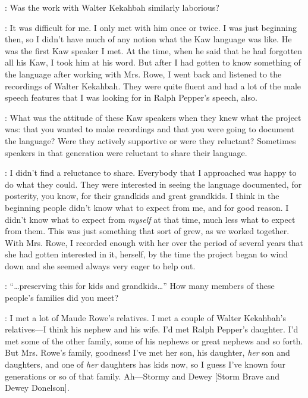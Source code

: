 \documentclass[output=paper]{LSP/langsci}
\begin{document}
: Was the work with Walter Kekahbah similarly laborious?

: It was difficult for me. I only met with him once or twice. I was just beginning then, so I didn't have much of any notion what the Kaw language was like. He was the first Kaw speaker I met. At the time, when he said that he had forgotten all his Kaw, I took him at his word. But after I had gotten to know something of the language after working with Mrs. Rowe, I went back and listened to the recordings of Walter Kekahbah. They were quite fluent and had a lot of the male speech features that I was looking for in Ralph Pepper's speech, also.

: What was the attitude of these Kaw speakers when they knew what the project was: that you wanted to make recordings and that you were going to document the language? Were they actively supportive or were they reluctant? Sometimes speakers in that generation were reluctant to share their language.

: I didn't find a reluctance to share. Everybody that I approached was happy to do what they could. They were interested in seeing the language documented, for posterity, you know, for their grandkids and great grandkids. I think in the beginning people didn't know what to expect from me, and for good reason. I didn't know what to expect from \textit{myself} at that time, much less what to expect from them. This was just something that sort of grew, as we worked together. With Mrs. Rowe, I recorded enough with her over the period of several years that she had gotten interested in it, herself, by the time the project began to wind down and she seemed always very eager to help out.

: ``\ldots preserving this for kids and grandkids\ldots'' How many members of these people's families did you meet?

:  I met a lot of Maude Rowe's relatives. I met a couple of Walter Kekahbah's relatives---I think his nephew and his wife. I'd met Ralph Pepper's daughter. I'd met some of the other family, some of his nephews or great nephews and so forth. But Mrs. Rowe's family, goodness! I've met her son, his daughter, \textit{her} son and daughters, and one of \textit{her} daughters has kids now, so I guess I've known four generations or so of that family. Ah---Stormy and Dewey [Storm Brave and Dewey Donelson].
\end{document}
